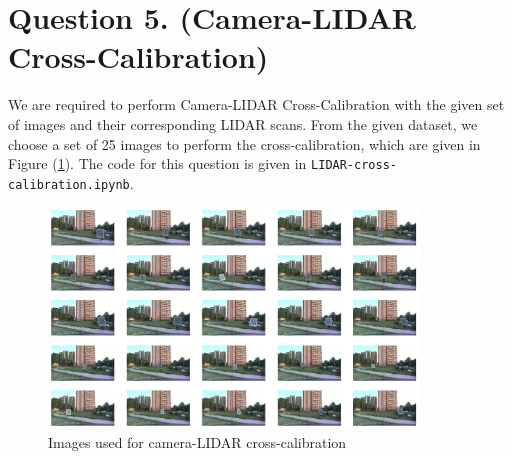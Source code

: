 \documentclass[10pt]{article}
\newcommand{\figref}[1]{Figure (\ref{fig:#1})}
\begin{document}
    \section*{\textbf{Question 5. (Camera-LIDAR Cross-Calibration)}}
    We are required to perform Camera-LIDAR Cross-Calibration with the given set of
    images and their corresponding LIDAR scans. From the given dataset, we choose a
    set of 25 images to perform the cross-calibration, which are given in
    \figref{final-lidar-set}. The code for this question is given in
    \texttt{LIDAR-cross-calibration.ipynb}.
    \begin{figure}[htbp]
        \begin{center}
            \includegraphics[width=0.875\textwidth]{Assets/Question-5/final-image-set.png}
            \caption{Images used for camera-LIDAR cross-calibration}
            \label{fig:final-lidar-set}
        \end{center}
    \end{figure}
\end{document}
